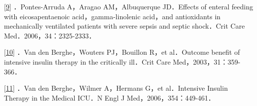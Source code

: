 \protect\hyperlink{text00028.htmlux5cux23ch9-27-back}{{[}9{]}}
．Pontes-Arruda A，Aragao AM，Albuquerque JD．Effects of enteral feeding
with eicosapentaenoic acid，gamma-linolenic acid，and antioxidants in
mechanically ventilated patients with severe sepsis and septic
shock．Crit Care Med．2006，34：2325-2333．

\protect\hyperlink{text00028.htmlux5cux23ch10-27-back}{{[}10{]}} ．Van
den Berghe，Wouters PJ，Bouillon R，et al．Outcome benefit of intensive
insulin therapy in the critically ill．Crit Care
Med，2003，31：359-366．

\protect\hyperlink{text00028.htmlux5cux23ch11-27-back}{{[}11{]}} ．Van
den Berghe，Wilmer A，Hermans G，et al．Intensive Insulin Therapy in the
Medical ICU．N Engl J Med，2006，354：449-461．

\protect\hypertarget{text00029.html}{}{}


